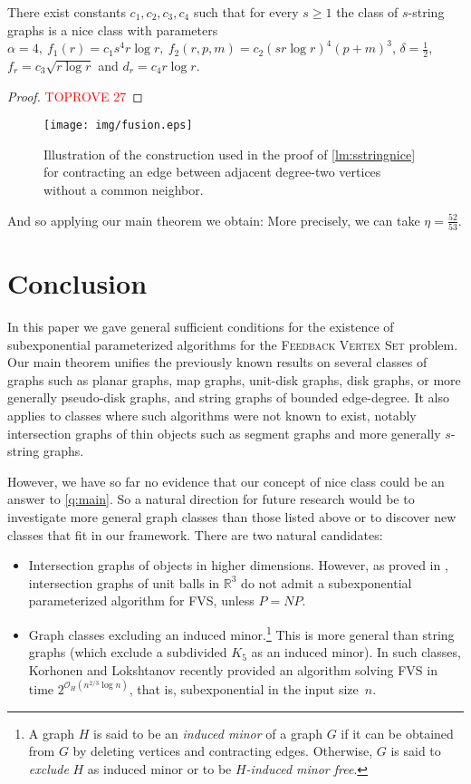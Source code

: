 \documentclass{amsart}
\newcommand{\RR}{\mathbb{R}}
\newcommand{\fvs}{\textsc{Feedback Vertex Set}\xspace}
\newcommand{\FVS}{\textsc{FVS}\xspace}
\renewcommand{\O}{\mathcal{O}}
\begin{document}
\begin{lemma}\label{lm:sstringnice}
    There exist constants $c_1,c_2,c_3,c_4$ such that for every $s\geq 1$ the class of $s$-string graphs is a nice class with parameters $\alpha=4,~f_1(r)=c_1s^4r\log r,~f_2(r,p,m)=c_2(sr\log r)^4(p+m)^3$, $\delta=\frac 12$, $f_r=c_3\sqrt{r\log r}$ and $d_r=c_4r\log r$.
\end{lemma}
\begin{proof}\textcolor{red}{TOPROVE 27}\end{proof}
\begin{figure}
    \centering
    \texttt{[image: img/fusion.eps]}
    \caption{Illustration of the construction used in the proof of \autoref{lm:sstringnice} for contracting an edge between adjacent degree-two vertices without a common neighbor.}
    \label{fig:rule2}
\end{figure}

And so applying our main theorem we obtain:
\maincor*
More precisely, we can take $\eta=\frac{52}{53}$.



\section{Conclusion}\label{sec:ccl}

In this paper we gave general sufficient conditions for the existence of subexponential parameterized algorithms for the \fvs problem. Our main theorem unifies the previously known results on several classes of graphs such as planar graphs, map graphs, unit-disk graphs, disk graphs, or more generally pseudo-disk graphs, and string graphs of bounded edge-degree.
It also applies to classes where such algorithms were not known to exist, notably intersection graphs of thin objects such as segment graphs and more generally $s$-string graphs.

However, we have so far no evidence that our concept of nice class could be an answer to \autoref{q:main}. So a natural direction for future research would be to investigate more general graph classes than those listed above or to discover new classes that fit in our framework.
There are two natural candidates:
\begin{itemize}
    \item Intersection graphs of objects in higher dimensions.  However, as proved in \cite{fomin2018excluded}, intersection graphs of unit balls in $\RR^3$ do not admit a subexponential parameterized algorithm for \FVS, unless $P=NP$.
    \item Graph classes excluding an induced minor.\footnote{A graph $H$ is said to be an \emph{induced minor} of a graph $G$ if it can be obtained from $G$ by deleting vertices and contracting edges. Otherwise, $G$ is said to \emph{exclude} $H$ as induced minor or to be \emph{$H$-induced minor free}.} This is more general than string graphs (which exclude a subdivided $K_5$ as an induced minor). In such classes, Korhonen and Lokshtanov \cite{korhonen2023induced} recently provided an algorithm solving \FVS in time $2^{\O_H(n^{2/3}\log n)}$, that is, subexponential in the input size~$n$.
    \end{itemize}
    
\end{document}
